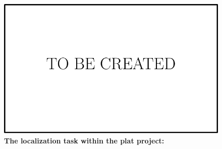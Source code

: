 \begin{figure}[t]
	\centering

	\includegraphics[width=\linewidth]{env/in_progress}
	\caption[Localization task in \acs*{plat}]{\textbf{The localization task within the \acs*{plat} project:} \label{fig:plat_pipeline} }
\end{figure}
